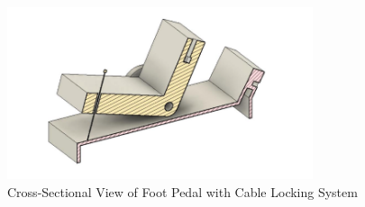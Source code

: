 \documentclass[12pt]{article}
\theoremstyle{definition} %
\theoremstyle{plain} %
\begin{document}
\begin{figure}[htbp]
  \centering
  \includegraphics[width=0.8\textwidth]{classes/Mathematics-of-Guitar-Strings/06-10/fgs/fig8.png}
  \caption{Cross-Sectional View of Foot Pedal with Cable Locking System}
  \label{fig:}
\end{figure}
\end{document}
